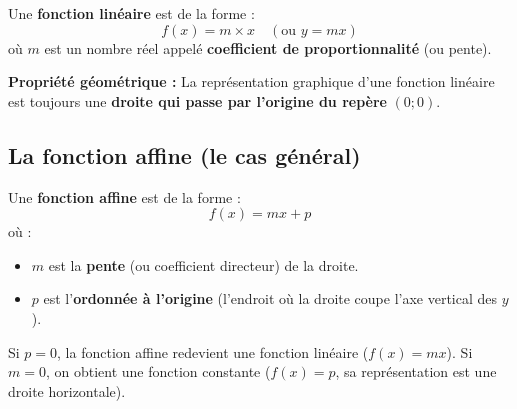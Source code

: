 \documentclass[../main.tex]{subfiles}
\begin{document}
\begin{definition}
Une \textbf{fonction linéaire} est de la forme :
\[
f(x) = m \times x \quad (\text{ou } y = mx)
\]
où $m$ est un nombre réel appelé \textbf{coefficient de proportionnalité} (ou pente).
\end{definition}

\textbf{Propriété géométrique :} La représentation graphique d'une fonction linéaire est toujours une \textbf{droite qui passe par l'origine du repère} $(0;0)$.

\subsection{La fonction affine (le cas général)}

\begin{definition}
Une \textbf{fonction affine} est de la forme :
\[
f(x) = mx + p
\]
où :
\begin{itemize}
  \item $m$ est la \textbf{pente} (ou coefficient directeur) de la droite.
  \item $p$ est l'\textbf{ordonnée à l'origine} (l'endroit où la droite coupe l'axe vertical des $y$).
\end{itemize}
\end{definition}

Si $p = 0$, la fonction affine redevient une fonction linéaire ($f(x) = mx$). Si $m = 0$, on obtient une fonction constante ($f(x) = p$, sa représentation est une droite horizontale).

\begin{center}
\end{center}
\end{document}
